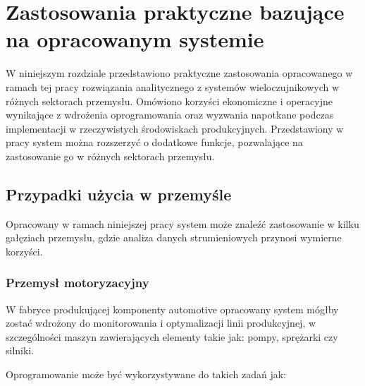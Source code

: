 \section{Zastosowania praktyczne bazujące na opracowanym systemie}
\label{sec:zastosowania_praktyczne}

W niniejszym rozdziale przedstawiono praktyczne zastosowania opracowanego w ramach tej pracy rozwiązania analitycznego z
systemów wieloczujnikowych w różnych sektorach przemysłu. Omówiono korzyści ekonomiczne i operacyjne wynikające z wdrożenia oprogramowania
oraz wyzwania napotkane podczas implementacji w rzeczywistych środowiskach produkcyjnych. Przedstawiony w pracy system można rozszerzyć o dodatkowe funkcje, pozwalające na zastosowanie go w różnych sektorach przemysłu.

\subsection{Przypadki użycia w przemyśle}
\label{subsec:przypadki_uzycia}

Opracowany w ramach niniejszej pracy system może znaleźć zastosowanie w kilku gałęziach przemysłu, gdzie analiza danych strumieniowych przynosi wymierne korzyści.

\subsubsection{Przemysł motoryzacyjny}
\label{subsubsec:przemysl_motoryzacyjny}

W fabryce produkującej komponenty automotive opracowany system mógłby zostać wdrożony do monitorowania i optymalizacji linii produkcyjnej, w szczególności maszyn zawierających elementy takie jak: pompy, sprężarki czy silniki. 

\vspace{0.3em}

Oprogramowanie może być wykorzystywane do takich zadań jak:

